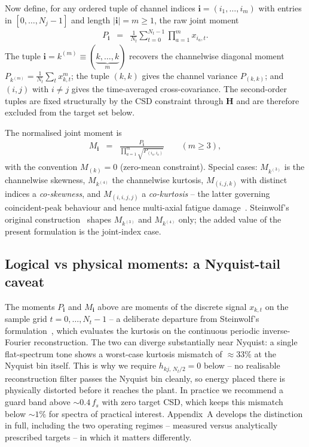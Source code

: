 \documentclass[10pt,a4paper]{article}
\numberwithin{equation}{section}
\newcommand{\block}[1]{\left[#1\right]}
\newcommand{\mat}[1]{\left(#1\right)}
\begin{document}
Now define, for any ordered tuple of channel indices $\mathbf{i} = \mat{i_1,\ldots,i_m}$ with entries in $\block{0,\ldots,N_j-1}$ and length $|\mathbf{i}|=m\geq 1$, the raw joint moment
\begin{eqnarray}
P_\mathbf{i} &=& \frac{1}{N_t}\sum_{t=0}^{N_t-1} \prod_{a=1}^{m} x_{i_a, t}.
\end{eqnarray}
The tuple $\mathbf{i} = k^{(m)} \equiv \mat{\underbrace{k,\ldots,k}_{m}}$ recovers the channelwise diagonal moment $P_{k^{(m)}} = \frac{1}{N_t}\sum_t x_{k,t}^m$; the tuple $(k,k)$ gives the channel variance $P_{(k,k)}$; and $(i,j)$ with $i\neq j$ gives the time-averaged cross-covariance. The second-order tuples are fixed structurally by the CSD constraint through $\mathbf{H}$ and are therefore excluded from the target set below.

The normalised joint moment is
\begin{eqnarray}
M_\mathbf{i} &=& \frac{P_\mathbf{i}}{\prod_{a=1}^{m} \sqrt{P_{\mat{i_a,i_a}}}} \qquad \mat{m \geq 3},
\end{eqnarray}
with the convention $M_{(k)} = 0$ (zero-mean constraint). Special cases: $M_{k^{(3)}}$ is the channelwise skewness, $M_{k^{(4)}}$ the channelwise kurtosis, $M_{(i,j,k)}$ with distinct indices a \emph{co-skewness}, and $M_{(i,i,j,j)}$ a \emph{co-kurtosis} -- the latter governing coincident-peak behaviour and hence multi-axial fatigue damage~\cite{saathoff2006synthetic}. Steinwolf's original construction~\cite{steinwolf2011ifft} shapes $M_{k^{(3)}}$ and $M_{k^{(4)}}$ only; the added value of the present formulation is the joint-index case.

\subsection*{Logical vs physical moments: a Nyquist-tail caveat}

The moments $P_\mathbf{i}$ and $M_\mathbf{i}$ above are moments of the discrete signal $x_{k,t}$ on the sample grid $t=0,\ldots,N_t-1$ -- a deliberate departure from Steinwolf's formulation~\cite{steinwolf2011ifft,steinwolf_book_ngaussian}, which evaluates the kurtosis on the continuous periodic inverse-Fourier reconstruction. The two can diverge substantially near Nyquist: a single flat-spectrum tone shows a worst-case kurtosis mismatch of ${\approx}33\%$ at the Nyquist bin itself. This is why we require $h_{k j,\, N_t/2}=0$ below -- no realisable reconstruction filter passes the Nyquist bin cleanly, so energy placed there is physically distorted before it reaches the plant. In practice we recommend a guard band above ${\sim}0.4\,f_s$ with zero target CSD, which keeps this mismatch below ${\sim}1\%$ for spectra of practical interest. Appendix~A develops the distinction in full, including the two operating regimes -- measured versus analytically prescribed targets -- in which it matters differently.
\end{document}
